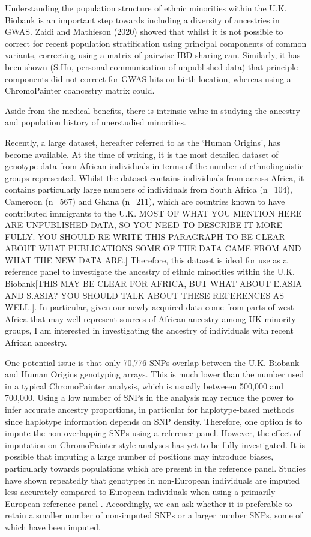 Understanding the population structure of ethnic minorities within the U.K. Biobank is an important step towards including a diversity of ancestries in GWAS. Zaidi and Mathieson (2020) \cite{zaidi2020demographic} showed that whilst it is not possible to correct for recent population stratification using principal components of common variants, correcting using a matrix of pairwise IBD sharing can. Similarly, it has been shown (S.Hu, personal communication of unpublished data) that principle components did not correct for GWAS hits on birth location, whereas using a ChromoPainter coancestry matrix could. 

Aside from the medical benefits, there is intrinsic value in studying the ancestry and population history of unerstudied minorities. 


Recently, a large dataset, hereafter referred to as the `Human Origins', has become available. At the time of writing, it is the most detailed dataset of genotype data from African individuals in terms of the number of ethnolinguistic groups represented. Whilst the dataset contains individuals from across Africa, it contains particularly large numbers of individuals from South Africa (n=104), Cameroon (n=567) and Ghana (n=211), which are countries known to have contributed immigrants to the U.K. MOST OF WHAT YOU MENTION HERE ARE UNPUBLISHED DATA, SO YOU NEED TO DESCRIBE IT MORE FULLY. YOU SHOULD RE-WRITE THIS PARAGRAPH TO BE CLEAR ABOUT WHAT PUBLICATIONS SOME OF THE DATA CAME FROM AND WHAT THE NEW DATA ARE.] Therefore, this dataset is ideal for use as a reference panel to investigate the ancestry of ethnic minorities within the U.K. Biobank[THIS MAY BE CLEAR FOR AFRICA, BUT WHAT ABOUT E.ASIA AND S.ASIA? YOU SHOULD TALK ABOUT THESE REFERENCES AS WELL.]. In particular, given our newly acquired data come from parts of west Africa that may well represent sources of African ancestry among UK minority groups, I am interested in investigating the ancestry of individuals with recent African ancestry. 

One potential issue is that only 70,776 SNPs overlap between the U.K. Biobank and Human Origins genotyping arrays. This is much lower than the number used in a typical ChromoPainter analysis, which is usually betweeen 500,000 and 700,000. Using a low number of SNPs in the analysis may reduce the power to infer accurate ancestry proportions, {\color{red}in particular for haplotype-based methods since haplotype information depends on SNP density}. Therefore, one option is to impute the non-overlapping SNPs using a reference panel. However, the effect of imputation on ChromoPainter-style analyses has yet to be fully investigated. It is possible that imputing a large number of positions may introduce biases, particularly towards populations which are present in the reference panel. Studies have shown repeatedly that genotypes in non-European individuals are imputed less accurately compared to European individuals when using a primarily European reference panel \cite{delaneau2018integrative, taliun2021sequencing}. Accordingly, we can ask whether it is preferable to retain a smaller number of non-imputed SNPs or a larger number SNPs, some of which have been imputed. 

